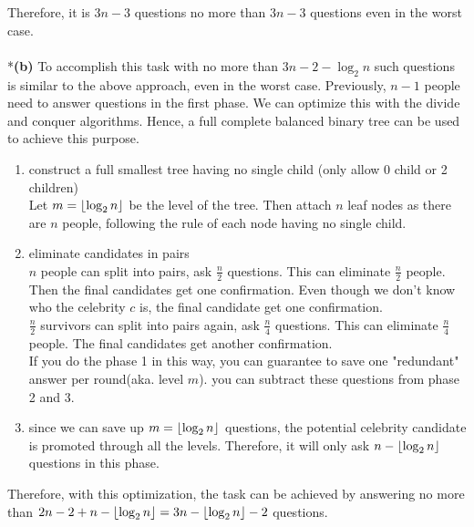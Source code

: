 \documentclass[a4paper]{scrartcl}
\begin{document}
Therefore, it is $3n-3$ questions no more than $3n-3$ questions even in the worst case.
\\
\\*{\bfseries(b)} To accomplish this task with no more than $3n-2-\log_2{n}$ such questions is similar to the above approach, even in the worst case. Previously, $n-1$ people need to answer questions in the first phase. We can optimize this with the divide and conquer algorithms. Hence, a full complete balanced binary tree can be used to  achieve this purpose.
\begin{enumerate}
  \item construct a full smallest tree having no single child (only allow 0 child or 2 children)\\
  Let $m =\left\lfloor \log_2{n} \right\rfloor$ be the level of the tree. Then attach $n$ leaf nodes as there are $n$ people, following the rule of each node having no single child.
  \item eliminate candidates in pairs\\
  $n$ people can split into pairs, ask $\frac{n}{2}$ questions. This can eliminate $\frac{n}{2}$ people. Then the final candidates get one confirmation. Even though we don't know who the celebrity $c$ is, the final candidate get one confirmation.\\ 
  $\frac{n}{2}$ survivors can split into pairs again, ask $\frac{n}{4}$ questions. This can eliminate $\frac{n}{4}$ people. The final candidates get another confirmation.\\
  If you do the phase 1 in this way, you can guarantee to save one "redundant" answer per round(aka. level $m$). you can subtract these questions from phase 2 and 3.
  \item since we can save up $m=\left\lfloor \log_2{n} \right\rfloor$ questions, the potential celebrity candidate is promoted through all the levels. Therefore, it will only ask $n-\left\lfloor \log_2{n} \right\rfloor$ questions in this phase.
\end{enumerate}
Therefore, with this optimization, the task can be achieved by answering no more than $2n-2+n-\left\lfloor \log_2{n} \right\rfloor=3n-\left\lfloor \log_2{n} \right\rfloor-2$ questions.
\end{document}
